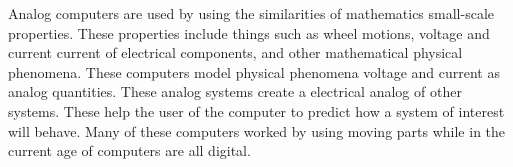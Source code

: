 \documentclass[../computer-history.tex]{subfiles}
\begin{document}
Analog computers are used by using the similarities of mathematics small-scale properties. These properties include things such as wheel motions, voltage and current current of electrical components, and other mathematical physical phenomena. These computers model physical phenomena voltage and current as analog quantities. These analog systems create a electrical analog of other systems. These help the user of the computer to predict how a system of interest will behave. Many of these computers worked by using moving parts while in the current age of computers are all digital. 



\end{document}
